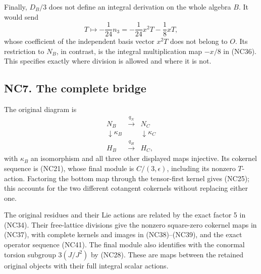 \documentclass[
]{article}
\begin{document}
Finally, \(D_B/3\) does not define an integral derivation on the whole
algebra \(B\). It would send \[
T\longmapsto-\frac1{24}n_3
=-\frac1{24}x^2T-\frac18xT,
\tag{NC43}
\] whose coefficient of the independent basis vector \(x^2T\) does not
belong to \(O\). Its restriction to \(N_B\), in contrast, is the
integral multiplication map \(-x/8\) in (NC36). This specifies exactly
where division is allowed and where it is not.

\subsection{NC7. The complete bridge}\label{nc7.-the-complete-bridge}

The original diagram is \[
\begin{matrix}
N_B&\xrightarrow{q_N}&N_C\\
\downarrow\kappa_B&&\downarrow\kappa_C\\
H_B&\xrightarrow{q_H}&H_C,
\end{matrix}
\] with \(\kappa_B\) an isomorphism and all three other displayed maps
injective. Its cokernel sequence is (NC21), whose final module is
\(C/(3,\epsilon)\), including its nonzero \(T\)-action. Factoring the
bottom map through the tensor-first kernel gives (NC25); this accounts
for the two different cotangent cokernels without replacing either one.

The original residues and their Lie actions are related by the exact
factor 5 in (NC34). Their free-lattice divisions give the nonzero
square-zero cokernel maps in (NC37), with complete kernels and images in
(NC38)--(NC39), and the exact operator sequence (NC41). The final module
also identifies with the conormal torsion subgroup \(3(J/J^2)\) by
(NC28). These are maps between the retained original objects with their
full integral scalar actions.
\end{document}
